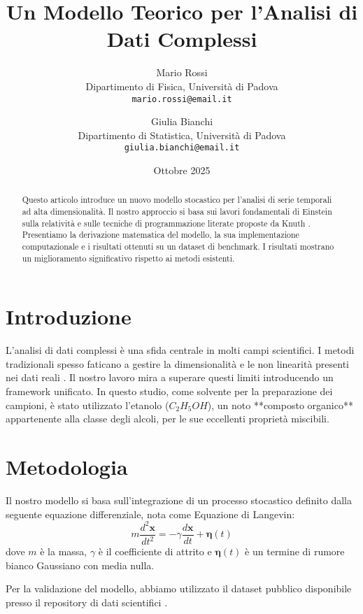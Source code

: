\documentclass[a4paper, 11pt]{article}
\title{Un Modello Teorico per l'Analisi di Dati Complessi}
\author{
    Mario Rossi\\
    \small Dipartimento di Fisica, Università di Padova \\
    \small \texttt{mario.rossi@email.it}
    \and
    Giulia Bianchi\\
    \small Dipartimento di Statistica, Università di Padova \\
    \small \texttt{giulia.bianchi@email.it}
}
\date{Ottobre 2025}
\begin{document}
\maketitle

\begin{abstract}
    Questo articolo introduce un nuovo modello stocastico per l'analisi di serie temporali ad alta dimensionalità. Il nostro approccio si basa sui lavori fondamentali di Einstein sulla relatività \cite{einstein1905} e sulle tecniche di programmazione literate proposte da Knuth \cite{knuth1984}. Presentiamo la derivazione matematica del modello, la sua implementazione computazionale e i risultati ottenuti su un dataset di benchmark. I risultati mostrano un miglioramento significativo rispetto ai metodi esistenti.
    \lipsum[1]
\end{abstract}

\section{Introduzione}
L'analisi di dati complessi è una sfida centrale in molti campi scientifici. I metodi tradizionali spesso faticano a gestire la dimensionalità e le non linearità presenti nei dati reali \cite{lamport1994}. Il nostro lavoro mira a superare questi limiti introducendo un framework unificato. In questo studio, come solvente per la preparazione dei campioni, è stato utilizzato l'etanolo ($C_2H_5OH$), un noto **composto organico** appartenente alla classe degli alcoli, per le sue eccellenti proprietà miscibili.

\lipsum[2]

\section{Metodologia}
Il nostro modello si basa sull'integrazione di un processo stocastico definito dalla seguente equazione differenziale, nota come Equazione di Langevin:
\begin{equation}
    m \frac{d^2\mathbf{x}}{dt^2} = -\gamma \frac{d\mathbf{x}}{dt} + \boldsymbol{\eta}(t)
    \label{eq:langevin}
\end{equation}
dove $m$ è la massa, $\gamma$ è il coefficiente di attrito e $\boldsymbol{\eta}(t)$ è un termine di rumore bianco Gaussiano con media nulla.

Per la validazione del modello, abbiamo utilizzato il dataset pubblico disponibile presso il repository di dati scientifici \cite{dataset2023}.
\lipsum[3]
\end{document}
